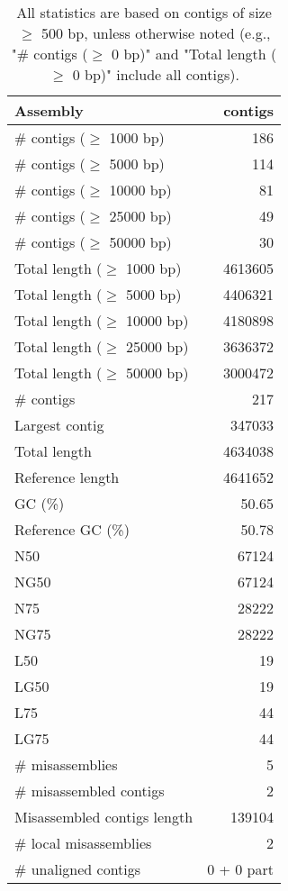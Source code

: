 \documentclass[12pt,a4paper]{article}
\begin{document}
\begin{table}[ht]
\begin{center}
\caption{All statistics are based on contigs of size $\geq$ 500 bp, unless otherwise noted (e.g., "\# contigs ($\geq$ 0 bp)" and "Total length ($\geq$ 0 bp)" include all contigs).}
\begin{tabular}{|l*{1}{|r}|}
\hline
Assembly & contigs \\ \hline
\# contigs ($\geq$ 1000 bp) & 186 \\ \hline
\# contigs ($\geq$ 5000 bp) & 114 \\ \hline
\# contigs ($\geq$ 10000 bp) & 81 \\ \hline
\# contigs ($\geq$ 25000 bp) & 49 \\ \hline
\# contigs ($\geq$ 50000 bp) & 30 \\ \hline
Total length ($\geq$ 1000 bp) & 4613605 \\ \hline
Total length ($\geq$ 5000 bp) & 4406321 \\ \hline
Total length ($\geq$ 10000 bp) & 4180898 \\ \hline
Total length ($\geq$ 25000 bp) & 3636372 \\ \hline
Total length ($\geq$ 50000 bp) & 3000472 \\ \hline
\# contigs & 217 \\ \hline
Largest contig & 347033 \\ \hline
Total length & 4634038 \\ \hline
Reference length & 4641652 \\ \hline
GC (\%) & 50.65 \\ \hline
Reference GC (\%) & 50.78 \\ \hline
N50 & 67124 \\ \hline
NG50 & 67124 \\ \hline
N75 & 28222 \\ \hline
NG75 & 28222 \\ \hline
L50 & 19 \\ \hline
LG50 & 19 \\ \hline
L75 & 44 \\ \hline
LG75 & 44 \\ \hline
\# misassemblies & 5 \\ \hline
\# misassembled contigs & 2 \\ \hline
Misassembled contigs length & 139104 \\ \hline
\# local misassemblies & 2 \\ \hline
\# unaligned contigs & 0 + 0 part \\ \hline

\end{tabular}
\end{center}
\end{table}
\end{document}
